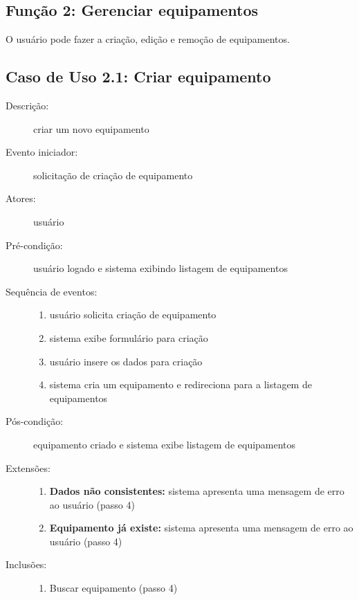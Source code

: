 \subsection{Função 2: Gerenciar equipamentos}
O usuário pode fazer a criação, edição e remoção de equipamentos.
%
\subsection{Caso de Uso 2.1: Criar equipamento}
\begin{description}
	\item[Descrição:] criar um novo equipamento
	\item[Evento iniciador:] solicitação de criação de equipamento
	\item[Atores:] usuário
	\item[Pré-condição:] usuário logado e sistema exibindo listagem de equipamentos
	\item[Sequência de eventos:] \hfill
		\begin{enumerate}
			\item{usuário solicita criação de equipamento}
			\item{sistema exibe formulário para criação}
			\item{usuário insere os dados para criação}
			\item{sistema cria um equipamento e redireciona para a listagem de equipamentos}
		\end{enumerate}
	\item[Pós-condição:] equipamento criado e sistema exibe listagem de equipamentos
	\item[Extensões:] \hfill
		\begin{enumerate}
			\item{\textbf{Dados não consistentes:} sistema apresenta uma mensagem de erro ao usuário (passo 4)}
			\item{\textbf{Equipamento já existe:} sistema apresenta uma mensagem de erro ao usuário (passo 4)}
		\end{enumerate}
	\item[Inclusões:] \hfill
		\begin{enumerate}
			\item{Buscar equipamento (passo 4)}
		\end{enumerate}
\end{description}
%
